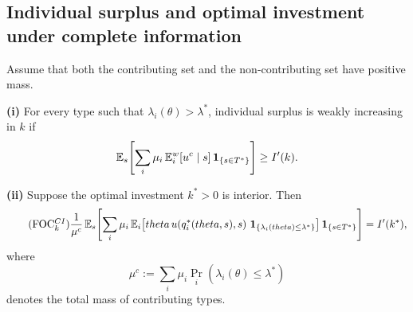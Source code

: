 \documentclass[master.tex]{subfiles}
\begin{document}
\subsection{Individual surplus and optimal investment under complete information}

\begin{proposition}\label{prop:CI-surplus}
Assume that both the contributing set and the non-contributing set have positive mass.

\noindent\textbf{(i)} For every type such that $\lambda_i(\theta)>\lambda^*$, individual surplus is weakly increasing in $k$ if
\[
\mathbb{E}_s\!\left[\sum_i \mu_i \, \mathbb{E}_i^w[u^c\mid s]\,\mathbf 1_{\{s\in T^*\}}\right] \geq I'(k).
\]

\noindent\textbf{(ii)} Suppose the optimal investment $k^*>0$ is interior. Then
\[
\tag{FOC$^{CI}_k$}\label{eq:FB-k1}
\frac{1}{\mu^c}\,
\E_s\!\left[\sum_i \mu_i\, \E_i\!\left[\theta\,u\!\left(q_i^*(\theta,s),s\right)\,\mathbf 1_{\{\lambda_i(\theta)\leq\lambda^*\}}\right]\mathbf 1_{\{s\in T^*\}}\right]
= I'(k^*),
\]
where
\[
\mu^c:=\sum_i \mu_i\Pr_i\!\left(\lambda_i(\theta)\leq\lambda^*\right)
\]
denotes the total mass of contributing types.
\end{proposition}
\end{document}
